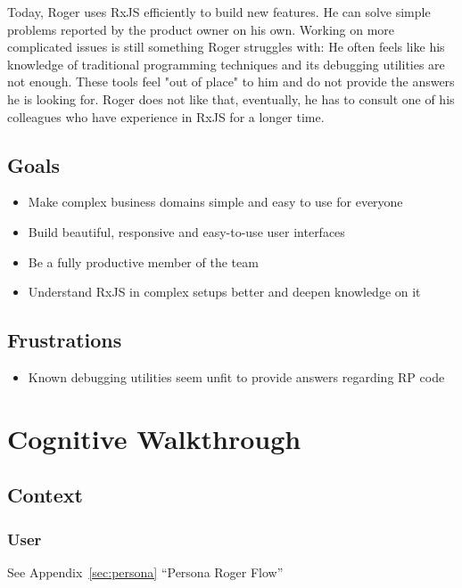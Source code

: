 \documentclass[sigplan,screen,nonacm,review]{acmart}
\begin{document}
Today, Roger uses RxJS efficiently to build new features. He can solve simple problems reported by the product owner on his own. Working on more complicated issues is still something Roger struggles with: He often feels like his knowledge of traditional programming techniques and its debugging utilities are not enough. These tools feel "out of place" to him and do not provide the answers he is looking for. Roger does not like that, eventually, he has to consult one of his colleagues who have experience in RxJS for a longer time.

\subsection{Goals}
\begin{itemize}
	\item Make complex business domains simple and easy to use for everyone
	\item Build beautiful, responsive and easy-to-use user interfaces
	\item Be a fully productive member of the team
	\item Understand RxJS in complex setups better and deepen knowledge on it
\end{itemize}

\subsection{Frustrations}
\begin{itemize}
	\item Known debugging utilities seem unfit to provide answers regarding RP code
\end{itemize}


\section{Cognitive Walkthrough}
\label{sec:cogitive-walkthrough-appendix}

\subsection{Context}

\subsubsection{User}

See Appendix~\ref{sec:persona} ``Persona Roger Flow''
\end{document}

